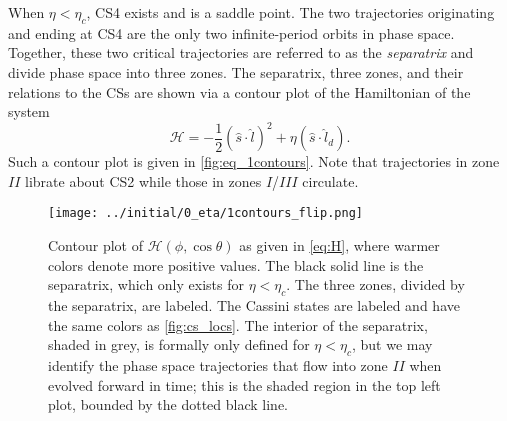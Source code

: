 \documentclass[
        fleqn,
        usenatbib,
        referee,
    ]{mnras}
\newcommand*{\p}[1]{\left(#1\right)}
\begin{document}
When $\eta < \eta_c$, CS4 exists and is a saddle point. The two trajectories
originating and ending at CS4 are the only two infinite-period orbits in phase
space. Together, these two critical trajectories are referred to as the
\emph{separatrix} and divide phase space into three zones. The separatrix, three
zones, and their relations to the CSs are shown via a contour plot of the
Hamiltonian of the system
\begin{equation}
    \mathcal{H} = -\frac{1}{2}\p{\hat{s} \cdot \hat{l}}^2
            + \eta \p{\hat{s} \cdot \hat{l}_d}.\label{eq:H}
\end{equation}
Such a contour plot is given in \autoref{fig:eq_1contours}. Note that
trajectories in zone $II$ librate about CS2 while those in zones $I$/$III$
circulate.
\begin{figure*}
    \centering
    \texttt{[image: ../initial/0\_eta/1contours\_flip.png]}
    \caption{Contour plot of $\mathcal{H}\p{\phi, \cos \theta}$ as given in
    \autoref{eq:H}, where warmer colors denote more positive values. The black
    solid line is the separatrix, which only exists for $\eta < \eta_c$. The
    three zones, divided by the separatrix, are labeled. The Cassini states are
    labeled and have the same colors as \autoref{fig:cs_locs}. The interior of
    the separatrix, shaded in grey, is formally only defined for $\eta <
    \eta_c$, but we may identify the phase space trajectories that flow into
    zone $II$ when evolved forward in time; this is the shaded region in the top
    left plot, bounded by the dotted black line.}\label{fig:eq_1contours}
\end{figure*}
\end{document}
